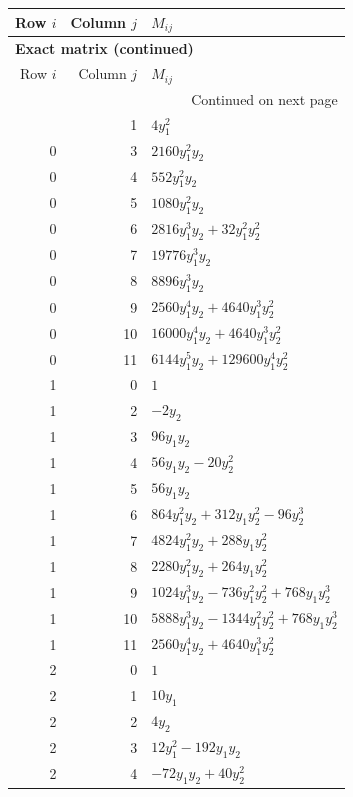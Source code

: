 \documentclass[10pt,a4paper]{article}
\begin{document}
{\small\setlength{\tabcolsep}{7pt}\begin{longtable}{rrp{125mm}}
\toprule Row $i$ & Column $j$ & $M_{ij}$\\\midrule\endfirsthead
\multicolumn{3}{l}{\textbf{Exact matrix (continued)}}\\
\toprule Row $i$ & Column $j$ & $M_{ij}$\\\midrule\endhead
\midrule\multicolumn{3}{r}{Continued on next page}\\\endfoot\bottomrule\endlastfoot
0 & 1 & $4 y_{1}^{2}$\\
0 & 3 & $2160 y_{1}^{2} y_{2}$\\
0 & 4 & $552 y_{1}^{2} y_{2}$\\
0 & 5 & $1080 y_{1}^{2} y_{2}$\\
0 & 6 & $2816 y_{1}^{3} y_{2} + 32 y_{1}^{2} y_{2}^{2}$\\
0 & 7 & $19776 y_{1}^{3} y_{2}$\\
0 & 8 & $8896 y_{1}^{3} y_{2}$\\
0 & 9 & $2560 y_{1}^{4} y_{2} + 4640 y_{1}^{3} y_{2}^{2}$\\
0 & 10 & $16000 y_{1}^{4} y_{2} + 4640 y_{1}^{3} y_{2}^{2}$\\
0 & 11 & $6144 y_{1}^{5} y_{2} + 129600 y_{1}^{4} y_{2}^{2}$\\
1 & 0 & $1$\\
1 & 2 & $- 2 y_{2}$\\
1 & 3 & $96 y_{1} y_{2}$\\
1 & 4 & $56 y_{1} y_{2} - 20 y_{2}^{2}$\\
1 & 5 & $56 y_{1} y_{2}$\\
1 & 6 & $864 y_{1}^{2} y_{2} + 312 y_{1} y_{2}^{2} - 96 y_{2}^{3}$\\
1 & 7 & $4824 y_{1}^{2} y_{2} + 288 y_{1} y_{2}^{2}$\\
1 & 8 & $2280 y_{1}^{2} y_{2} + 264 y_{1} y_{2}^{2}$\\
1 & 9 & $1024 y_{1}^{3} y_{2} - 736 y_{1}^{2} y_{2}^{2} + 768 y_{1} y_{2}^{3}$\\
1 & 10 & $5888 y_{1}^{3} y_{2} - 1344 y_{1}^{2} y_{2}^{2} + 768 y_{1} y_{2}^{3}$\\
1 & 11 & $2560 y_{1}^{4} y_{2} + 4640 y_{1}^{3} y_{2}^{2}$\\
2 & 0 & $1$\\
2 & 1 & $10 y_{1}$\\
2 & 2 & $4 y_{2}$\\
2 & 3 & $12 y_{1}^{2} - 192 y_{1} y_{2}$\\
2 & 4 & $- 72 y_{1} y_{2} + 40 y_{2}^{2}$\\

\end{longtable}}
\end{document}
